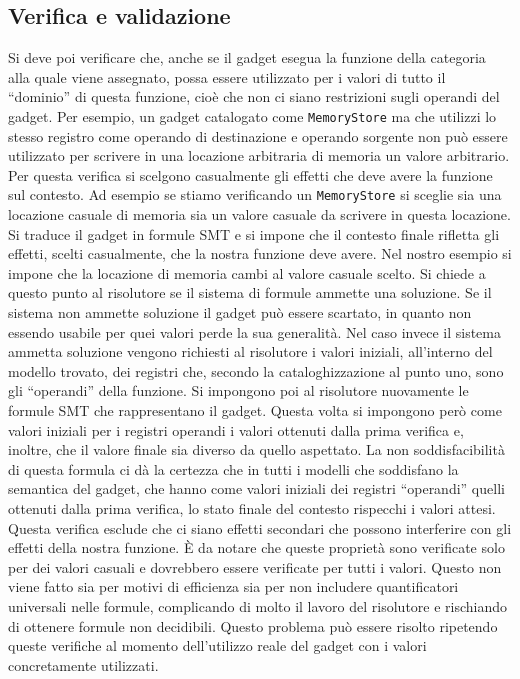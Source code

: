 \subsection{Verifica e validazione}\label{s:verifica_validazione}
Si deve poi verificare che, anche se il gadget esegua la funzione
della categoria alla quale viene assegnato, possa essere utilizzato
per i valori di tutto il ``dominio'' di questa funzione, cioè che non
ci siano restrizioni sugli operandi del gadget. Per esempio, un gadget
catalogato come \lstinline{MemoryStore} ma che utilizzi lo stesso
registro come operando di destinazione e operando sorgente non può
essere utilizzato per scrivere in una locazione arbitraria di memoria
un valore arbitrario. Per questa verifica si scelgono casualmente gli
effetti che deve avere la funzione sul contesto. Ad esempio se stiamo
verificando un \lstinline{MemoryStore} si sceglie sia una locazione
casuale di memoria sia un valore casuale da scrivere in questa
locazione. Si traduce il gadget in formule SMT e si impone che il
contesto finale rifletta gli effetti, scelti casualmente, che la
nostra funzione deve avere. Nel nostro esempio si impone che la
locazione di memoria cambi al valore casuale scelto. Si chiede a
questo punto al risolutore se il sistema di formule ammette una
soluzione. Se il sistema non ammette soluzione il gadget può essere
scartato, in quanto non essendo usabile per quei valori perde la sua
generalità. Nel caso invece il sistema ammetta soluzione vengono
richiesti al risolutore i valori iniziali, all'interno del modello
trovato, dei registri che, secondo la cataloghizzazione al punto uno,
sono gli ``operandi'' della funzione. Si impongono poi al risolutore
nuovamente le formule SMT che rappresentano il gadget.  Questa volta
si impongono però come valori iniziali per i registri operandi i
valori ottenuti dalla prima verifica e, inoltre, che il valore finale
sia diverso da quello aspettato. La non soddisfacibilità di questa
formula ci dà la certezza che in tutti i modelli che soddisfano la
semantica del gadget, che hanno come valori iniziali dei registri
``operandi'' quelli ottenuti dalla prima verifica, lo stato finale del
contesto rispecchi i valori attesi. Questa verifica esclude che ci
siano effetti secondari che possono interferire con gli effetti della
nostra funzione. È da notare che queste proprietà sono verificate solo
per dei valori casuali e dovrebbero essere verificate per tutti i
valori. Questo non viene fatto sia per motivi di efficienza sia per
non includere quantificatori universali nelle formule, complicando di
molto il lavoro del risolutore e rischiando di ottenere formule non
decidibili. Questo problema può essere risolto ripetendo queste
verifiche al momento dell'utilizzo reale del gadget con i valori
concretamente utilizzati.

